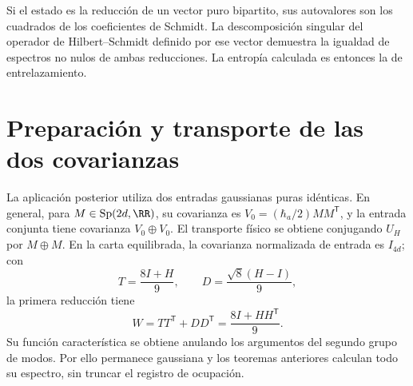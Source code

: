 Si el estado es la reducción de un vector puro bipartito, sus
autovalores son los cuadrados de los coeficientes de Schmidt.
La descomposición singular del operador de Hilbert--Schmidt definido
por ese vector demuestra la igualdad de espectros no nulos de ambas
reducciones. La entropía calculada es entonces la de entrelazamiento.

\section{Preparación y transporte de las dos covarianzas}
La aplicación posterior utiliza dos entradas gaussianas puras idénticas.
En general, para \(M\in\operatorname{Sp}(2d,\RR)\), su covarianza es
\(V_0=(\hbar_a/2)MM^{\mathsf T}\), y la entrada conjunta tiene
covarianza \(V_0\oplus V_0\). El transporte físico se obtiene
conjugando \(U_H\) por \(M\oplus M\). En la carta equilibrada,
la covarianza normalizada de entrada es \(I_{4d}\); con
\[
 T=\frac{8I+H}{9},\qquad D=\frac{\sqrt8(H-I)}9,
\]
la primera reducción tiene
\[
 W=TT^{\mathsf T}+DD^{\mathsf T}=\frac{8I+HH^{\mathsf T}}9.
\]
Su función característica se obtiene anulando los argumentos del
segundo grupo de modos. Por ello permanece gaussiana y los teoremas
anteriores calculan todo su espectro, sin truncar el registro de ocupación.

